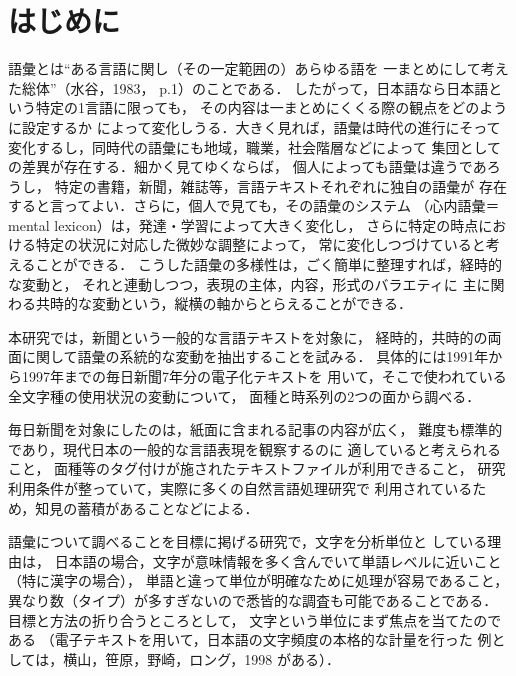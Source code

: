 

\maketitle


\section{はじめに}

  語彙とは“ある言語に関し（その一定範囲の）あらゆる語を
一まとめにして考えた総体”（水谷，1983， p.1）のことである．
したがって，日本語なら日本語という特定の1言語に限っても，
その内容は一まとめにくくる際の観点をどのように設定するか
によって変化しうる．大きく見れば，語彙は時代の進行にそって
変化するし，同時代の語彙にも地域，職業，社会階層などによって
集団としての差異が存在する．細かく見てゆくならば，
個人によっても語彙は違うであろうし，
特定の書籍，新聞，雑誌等，言語テキストそれぞれに独自の語彙が
存在すると言ってよい．さらに，個人で見ても，その語彙のシステム
（心内語彙＝mental lexicon）は，発達・学習によって大きく変化し，
さらに特定の時点における特定の状況に対応した微妙な調整によって，
常に変化しつづけていると考えることができる．
こうした語彙の多様性は，ごく簡単に整理すれば，経時的な変動と，
それと連動しつつ，表現の主体，内容，形式のバラエティに
主に関わる共時的な変動という，縦横の軸からとらえることができる．

  本研究では，新聞という一般的な言語テキストを対象に，
経時的，共時的の両面に関して語彙の系統的な変動を抽出することを試みる．
具体的には1991年から1997年までの毎日新聞7年分の電子化テキストを
用いて，そこで使われている全文字種の使用状況の変動について，
面種と時系列の2つの面から調べる．

  毎日新聞を対象にしたのは，紙面に含まれる記事の内容が広く，
難度も標準的であり，現代日本の一般的な言語表現を観察するのに
適していると考えられること，
面種等のタグ付けが施されたテキストファイルが利用できること，
研究利用条件が整っていて，実際に多くの自然言語処理研究で
利用されているため，知見の蓄積があることなどによる．

  語彙について調べることを目標に掲げる研究で，文字を分析単位と
している理由は，
日本語の場合，文字が意味情報を多く含んでいて単語レベルに近いこと
（特に漢字の場合），
単語と違って単位が明確なために処理が容易であること，
異なり数（タイプ）が多すぎないので悉皆的な調査も可能であることである．
目標と方法の折り合うところとして，
文字という単位にまず焦点を当てたのである
（電子テキストを用いて，日本語の文字頻度の本格的な計量を行った
例としては，横山，笹原，野崎，ロング，1998 がある）．

